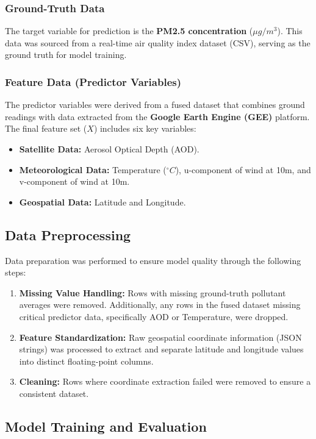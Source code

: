 \documentclass[12pt, a4paper]{article}
\begin{document}
\subsubsection{Ground-Truth Data}
The target variable for prediction is the \textbf{PM2.5 concentration} ($\mu g/m^3$). This data was sourced from a real-time air quality index dataset (CSV), serving as the ground truth for model training.

\subsubsection{Feature Data (Predictor Variables)}
The predictor variables were derived from a fused dataset that combines ground readings with data extracted from the \textbf{Google Earth Engine (GEE)} platform. The final feature set ($X$) includes six key variables:
\begin{itemize}
    \item \textbf{Satellite Data:} Aerosol Optical Depth (AOD).
    \item \textbf{Meteorological Data:} Temperature ($^{\circ}C$), u-component of wind at 10m, and v-component of wind at 10m.
    \item \textbf{Geospatial Data:} Latitude and Longitude.
\end{itemize}

\subsection{Data Preprocessing}
Data preparation was performed to ensure model quality through the following steps:
\begin{enumerate}
    \item \textbf{Missing Value Handling:} Rows with missing ground-truth pollutant averages were removed. Additionally, any rows in the fused dataset missing critical predictor data, specifically AOD or Temperature, were dropped.
    \item \textbf{Feature Standardization:} Raw geospatial coordinate information (JSON strings) was processed to extract and separate latitude and longitude values into distinct floating-point columns.
    \item \textbf{Cleaning:} Rows where coordinate extraction failed were removed to ensure a consistent dataset.
\end{enumerate}

\subsection{Model Training and Evaluation}
\end{document}

